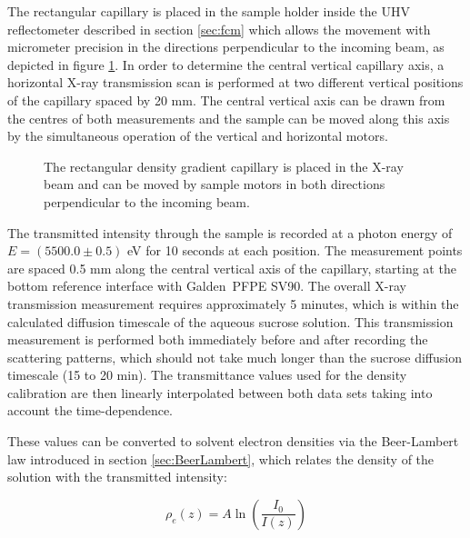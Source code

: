 
The rectangular capillary is placed in the sample holder inside the UHV reflectometer described in section \ref{sec:fcm} which allows the movement with micrometer precision in the directions perpendicular to the incoming beam, as depicted in figure \ref{fig:DensityGradientCapillarySetup}. In order to determine the central vertical capillary axis, a horizontal X-ray transmission scan is performed at two different vertical positions of the capillary spaced by 20 mm. The central vertical axis can be drawn from the centres of both measurements and the sample can be moved along this axis by the simultaneous operation of the vertical and horizontal motors.

\begin{figure}%
	\centering
        	\def\svgwidth{0.7\linewidth}
		
		\caption[Scheme of the contrast variation technique in SAXS with a density gradient capillary.]{The rectangular density gradient capillary is placed in the X-ray beam and can be moved by sample motors in both directions perpendicular to the incoming beam.}
		\label{fig:DensityGradientCapillarySetup}
\end{figure}

The transmitted intensity through the sample is recorded at a photon energy of \(E = (5500.0 \pm  0.5)\) eV for 10 seconds at each position. The measurement points are spaced 0.5 mm along the central vertical axis of the capillary, starting at the bottom reference interface with Galden\textregistered\ PFPE SV90. The overall X-ray transmission measurement requires approximately 5 minutes, which is within the calculated diffusion timescale of the aqueous sucrose solution. This transmission measurement is performed both immediately before and after recording the scattering patterns, which should not take much longer than the sucrose diffusion timescale (15 to 20 min). The transmittance values used for the density calibration are then linearly interpolated between both data sets taking into account the time-dependence. 

These values can be converted to solvent electron densities via the Beer-Lambert law introduced in section \ref{sec:BeerLambert}, which relates the density of the solution with the transmitted intensity:

\begin{equation}
  \rho_e(z) = A \ln\left( \frac{I_0}{I(z)} \right)%
\end{equation}

